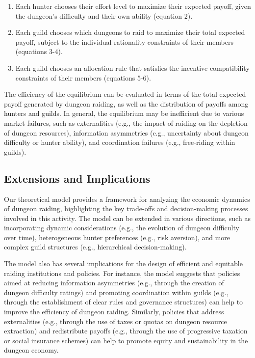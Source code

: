 \documentclass[12pt, a4paper]{article}
\begin{document}
\begin{enumerate}
    \item Each hunter chooses their effort level to maximize their expected payoff, given the dungeon's difficulty and their own ability (equation 2).
    \item Each guild chooses which dungeons to raid to maximize their total expected payoff, subject to the individual rationality constraints of their members (equations 3-4).
    \item Each guild chooses an allocation rule that satisfies the incentive compatibility constraints of their members (equations 5-6).
\end{enumerate}

The efficiency of the equilibrium can be evaluated in terms of the total expected payoff generated by dungeon raiding, as well as the distribution of payoffs among hunters and guilds. In general, the equilibrium may be inefficient due to various market failures, such as externalities (e.g., the impact of raiding on the depletion of dungeon resources), information asymmetries (e.g., uncertainty about dungeon difficulty or hunter ability), and coordination failures (e.g., free-riding within guilds).

\subsection{Extensions and Implications}
Our theoretical model provides a framework for analyzing the economic dynamics of dungeon raiding, highlighting the key trade-offs and decision-making processes involved in this activity. The model can be extended in various directions, such as incorporating dynamic considerations (e.g., the evolution of dungeon difficulty over time), heterogeneous hunter preferences (e.g., risk aversion), and more complex guild structures (e.g., hierarchical decision-making).

The model also has several implications for the design of efficient and equitable raiding institutions and policies. For instance, the model suggests that policies aimed at reducing information asymmetries (e.g., through the creation of dungeon difficulty ratings) and promoting coordination within guilds (e.g., through the establishment of clear rules and governance structures) can help to improve the efficiency of dungeon raiding. Similarly, policies that address externalities (e.g., through the use of taxes or quotas on dungeon resource extraction) and redistribute payoffs (e.g., through the use of progressive taxation or social insurance schemes) can help to promote equity and sustainability in the dungeon economy.
\end{document}

